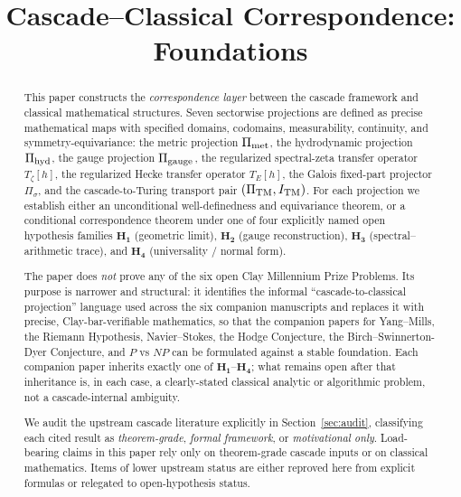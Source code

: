 \documentclass[11pt, a4paper]{amsart}
\title{Cascade--Classical Correspondence: Foundations}
\author{}
\date{}
\theoremstyle{definition}
\newcommand{\met}{{\rm met}}
\newcommand{\hyd}{{\rm hyd}}
\newcommand{\gge}{{\rm gauge}}
\newcommand{\TM}{{\rm TM}}
\begin{document}
\maketitle

\begin{abstract}
This paper constructs the \emph{correspondence layer} between the
cascade framework \cite{CascadeFoundations} and classical
mathematical structures. Seven sectorwise projections are defined
as precise mathematical maps with specified domains, codomains,
measurability, continuity, and symmetry-equivariance: the metric
projection $\Pi_{\met}$, the hydrodynamic projection $\Pi_{\hyd}$,
the gauge projection $\Pi_{\gge}$, the regularized spectral-zeta
transfer operator $T_\zeta[h]$, the regularized Hecke transfer
operator $T_E[h]$, the Galois fixed-part projector $\Pi_\sigma$,
and the cascade-to-Turing transport pair $(\Pi_{\TM}, I_{\TM})$.
For each projection we establish either an unconditional
well-definedness and equivariance theorem, or a conditional
correspondence theorem under one of four explicitly named open
hypothesis families
$\mathbf{H_1}$ (geometric limit),
$\mathbf{H_2}$ (gauge reconstruction),
$\mathbf{H_3}$ (spectral--arithmetic trace), and
$\mathbf{H_4}$ (universality / normal form).

The paper does \emph{not} prove any of the six open Clay Millennium
Prize Problems. Its purpose is narrower and structural: it
identifies the informal ``cascade-to-classical projection'' language
used across the six companion manuscripts and replaces it with
precise, Clay-bar-verifiable mathematics, so that the companion
papers for Yang--Mills, the Riemann Hypothesis, Navier--Stokes, the
Hodge Conjecture, the Birch--Swinnerton-Dyer Conjecture, and $P$
vs $NP$ can be formulated against a stable foundation. Each
companion paper inherits exactly one of
$\mathbf{H_1}$--$\mathbf{H_4}$; what remains open after that
inheritance is, in each case, a clearly-stated classical analytic
or algorithmic problem, not a cascade-internal ambiguity.

We audit the upstream cascade literature explicitly in
Section~\ref{sec:audit}, classifying each cited result as
\emph{theorem-grade}, \emph{formal framework}, or
\emph{motivational only}. Load-bearing claims in this paper rely
only on theorem-grade cascade inputs or on classical mathematics.
Items of lower upstream status are either reproved here from
explicit formulas or relegated to open-hypothesis status.
\end{abstract}
\end{document}
